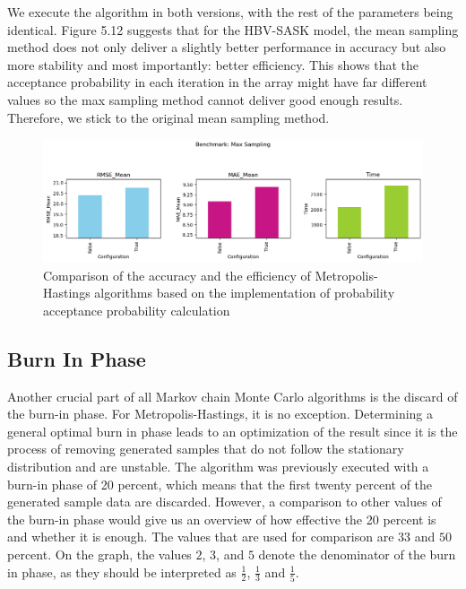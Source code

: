We execute the algorithm in both versions, with the rest of the parameters being identical. Figure 5.12 suggests that for the HBV-SASK model, the mean sampling method does not only deliver a slightly better performance in accuracy but also more stability and most importantly: better efficiency. This shows that the acceptance probability in each iteration in the array might have far different values so the max sampling method cannot deliver good enough results. Therefore, we stick to the original mean sampling method.


\begin{figure}[H]
    \centering
    \includegraphics[width=1\textwidth]{figures/basic_mh/benchmark/max_sampling.png}
    \captionsetup{width=.8\textwidth}
    \caption{Comparison of the accuracy and the efficiency of Metropolis-Hastings algorithms based on the implementation of probability acceptance probability calculation}
    \label{fig:enter-label}
\end{figure}



\subsection{Burn In Phase}
Another crucial part of all Markov chain Monte Carlo algorithms is the discard of the burn-in phase. For Metropolis-Hastings, it is no exception. Determining a general optimal burn in phase leads to an optimization of the result since it is the process of removing generated samples that do not follow the stationary distribution and are unstable. The algorithm was previously executed with a burn-in phase of 20 percent, which means that the first twenty percent of the generated sample data are discarded. However, a comparison to other values of the burn-in phase would give us an overview of how effective the 20 percent is and whether it is enough. The values that are used for comparison are $33$ and $50$ percent. On the graph, the values $2$, $3$, and $5$ denote the denominator of the burn in phase, as they should be interpreted as $\frac 1 2$, $\frac 1 3$ and $\frac 1 5$.

